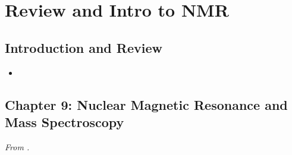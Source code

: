 \documentclass[../notes.tex]{subfiles}
\begin{document}
\chapter{Review and Intro to NMR}
\section{Introduction and Review}
\begin{itemize}
    \item {}
\end{itemize}



\section{Chapter 9: Nuclear Magnetic Resonance and Mass Spectroscopy}
\emph{From \textcite{bib:SolomonsEtAl}.}
\end{document}

